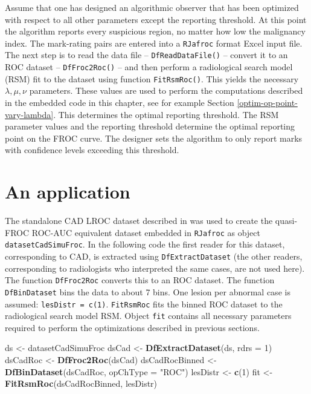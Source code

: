 \documentclass[
]{book}
\newenvironment{Shaded}{\begin{snugshade}}{\end{snugshade}}
\newcommand{\DataTypeTok}[1]{\textcolor[rgb]{0.13,0.29,0.53}{#1}}
\newcommand{\DecValTok}[1]{\textcolor[rgb]{0.00,0.00,0.81}{#1}}
\newcommand{\KeywordTok}[1]{\textcolor[rgb]{0.13,0.29,0.53}{\textbf{#1}}}
\newcommand{\NormalTok}[1]{#1}
\newcommand{\StringTok}[1]{\textcolor[rgb]{0.31,0.60,0.02}{#1}}
\begin{document}
Assume that one has designed an algorithmic observer that has been optimized with respect to all other parameters except the reporting threshold. At this point the algorithm reports every suspicious region, no matter how low the malignancy index. The mark-rating pairs are entered into a \texttt{RJafroc} format Excel input file. The next step is to read the data file -- \texttt{DfReadDataFile()} -- convert it to an ROC dataset -- \texttt{DfFroc2Roc()} -- and then perform a radiological search model (RSM) fit to the dataset using function \texttt{FitRsmRoc()}. This yields the necessary \(\lambda, \mu, \nu\) parameters. These values are used to perform the computations described in the embedded code in this chapter, see for example Section \ref{optim-op-point-vary-lambda}. This determines the optimal reporting threshold. The RSM parameter values and the reporting threshold determine the optimal reporting point on the FROC curve. The designer sets the algorithm to only report marks with confidence levels exceeding this threshold.

\hypertarget{optim-op-point-application}{%
\section{An application}\label{optim-op-point-application}}

The standalone CAD LROC dataset described in \citep{hupse2013standalone} was used to create the quasi-FROC ROC-AUC equivalent dataset embedded in \texttt{RJafroc} as object \texttt{datasetCadSimuFroc}. In the following code the first reader for this dataset, corresponding to CAD, is extracted using \texttt{DfExtractDataset} (the other readers, corresponding to radiologists who interpreted the same cases, are not used here). The function \texttt{DfFroc2Roc} converts this to an ROC dataset. The function \texttt{DfBinDataset} bins the data to about 7 bins. One lesion per abnormal case is assumed: \texttt{lesDistr\ =\ c(1)}. \texttt{FitRsmRoc} fits the binned ROC dataset to the radiological search model RSM. Object \texttt{fit} contains all necessary parameters required to perform the optimizations described in previous sections.

\begin{Shaded}
\begin{Highlighting}[]
\NormalTok{ds <-}\StringTok{ }\NormalTok{datasetCadSimuFroc}
\NormalTok{dsCad <-}\StringTok{ }\KeywordTok{DfExtractDataset}\NormalTok{(ds, }\DataTypeTok{rdrs =} \DecValTok{1}\NormalTok{)}
\NormalTok{dsCadRoc <-}\StringTok{ }\KeywordTok{DfFroc2Roc}\NormalTok{(dsCad)}
\NormalTok{dsCadRocBinned <-}\StringTok{ }\KeywordTok{DfBinDataset}\NormalTok{(dsCadRoc, }\DataTypeTok{opChType =} \StringTok{"ROC"}\NormalTok{)}
\NormalTok{lesDistr <-}\StringTok{ }\KeywordTok{c}\NormalTok{(}\DecValTok{1}\NormalTok{)}
\NormalTok{fit <-}\StringTok{ }\KeywordTok{FitRsmRoc}\NormalTok{(dsCadRocBinned, lesDistr)}
\end{Highlighting}
\end{Shaded}
\end{document}
